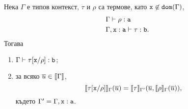 \begin{framed}
\begin{lemma}\label{lem:pcf:substitution}
  Нека $\Gamma$ е типов контекст, $\tau$ и $\rho$ са термове, като $\texttt{x} \not\in \texttt{dom}(\Gamma)$,
  \begin{align*}
    & \Gamma \vdash \rho : \texttt{a}\\
    & \Gamma, \texttt{x}:\texttt{a} \vdash \tau : \texttt{b}.
  \end{align*}
  Тогава
  \begin{enumerate}[1)]
  \item
    $\Gamma \vdash \tau[\texttt{x}/{\rho}] : \texttt{b}$;
  \item
    за всяко $\overline{u} \in \llbracket{\Gamma}\rrbracket$,
    \[\llbracket{\tau[\texttt{x}/{\rho}]}\rrbracket_\Gamma(\overline{u}) = \llbracket{\tau}\rrbracket_{\Gamma'}(\overline{u},\llbracket{\rho}\rrbracket_\Gamma(\overline{u})),\]
    където $\Gamma' = \Gamma, \texttt{x}:\texttt{a}$.  
  \end{enumerate}
\end{lemma}
\end{framed}
